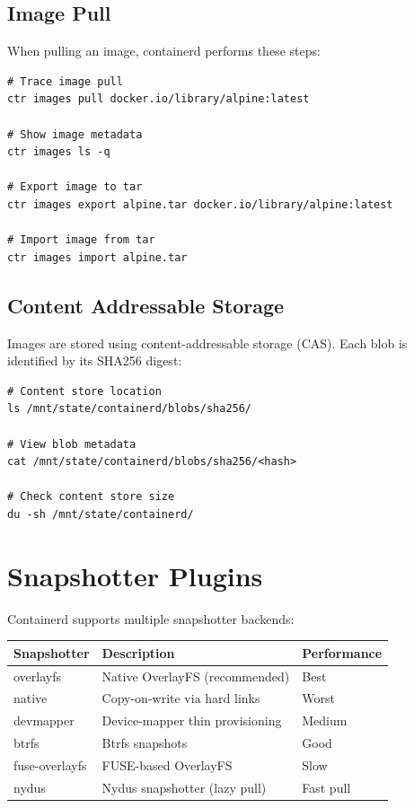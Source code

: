 \subsection{Image Pull}

When pulling an image, containerd performs these steps:

\begin{lstlisting}
# Trace image pull
ctr images pull docker.io/library/alpine:latest

# Show image metadata
ctr images ls -q

# Export image to tar
ctr images export alpine.tar docker.io/library/alpine:latest

# Import image from tar
ctr images import alpine.tar
\end{lstlisting}

\subsection{Content Addressable Storage}

Images are stored using content-addressable storage (CAS). Each blob
is identified by its SHA256 digest:

\begin{lstlisting}
# Content store location
ls /mnt/state/containerd/blobs/sha256/

# View blob metadata
cat /mnt/state/containerd/blobs/sha256/<hash>

# Check content store size
du -sh /mnt/state/containerd/
\end{lstlisting}

\section{Snapshotter Plugins}

Containerd supports multiple snapshotter backends:

\begin{longtable}{|p{3.5cm}|p{4cm}|p{4cm}|}
\hline
\textbf{Snapshotter} & \textbf{Description} & \textbf{Performance} \\
\hline
overlayfs & Native OverlayFS (recommended) & Best \\
native & Copy-on-write via hard links & Worst \\
devmapper & Device-mapper thin provisioning & Medium \\
btrfs & Btrfs snapshots & Good \\
fuse-overlayfs & FUSE-based OverlayFS & Slow \\
nydus & Nydus snapshotter (lazy pull) & Fast pull \\
\hline
\end{longtable}


